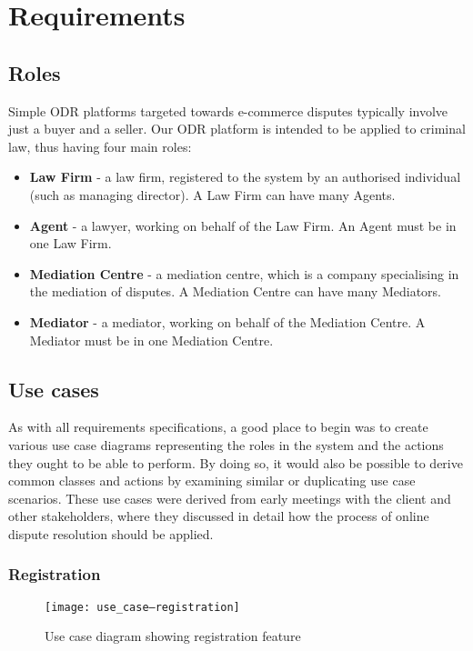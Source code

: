 \chapter{Requirements}

\section{Roles}

Simple ODR platforms targeted towards e-commerce disputes typically involve just a buyer and a seller. Our ODR platform is intended to be applied to criminal law, thus having four main roles:

\begin{itemize}
\item \textbf{Law Firm} - a law firm, registered to the system by an authorised individual (such as managing director). A Law Firm can have many Agents.
\item \textbf{Agent} - a lawyer, working on behalf of the Law Firm. An Agent must be in one Law Firm.
\item \textbf{Mediation Centre} - a mediation centre, which is a company specialising in the mediation of disputes. A Mediation Centre can have many Mediators.
\item \textbf{Mediator} - a mediator, working on behalf of the Mediation Centre. A Mediator must be in one Mediation Centre.
\end{itemize}

\section{Use cases}

As with all requirements specifications, a good place to begin was to create various use case diagrams representing the roles in the system and the actions they ought to be able to perform. By doing so, it would also be possible to derive common classes and actions by examining similar or duplicating use case scenarios. These use cases were derived from early meetings with the client and other stakeholders, where they discussed in detail how the process of online dispute resolution should be applied.

\subsection{Registration}

\begin{figure}[h!]
  \centering
    \ifimages
    \texttt{[image: use\_case--registration]}
    \fi
  \caption{Use case diagram showing registration feature}
  \label{uml:useCase:registration}
\end{figure}


